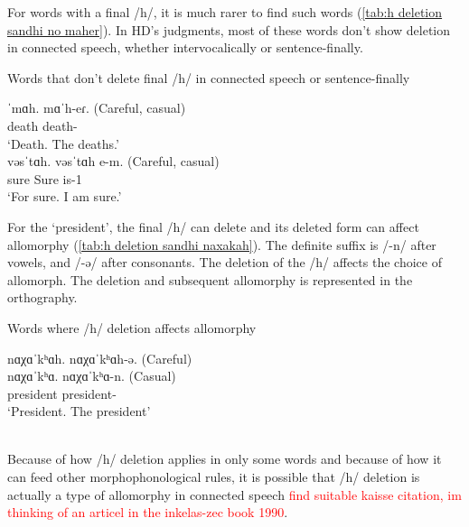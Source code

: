   	For words with a final /h/, it is much rarer to find such words (\ref{tab:h deletion sandhi no maher}). In HD's judgments, most of these words don't show deletion in connected speech, whether intervocalically or sentence-finally. 
  	
  	\begin{exe}
    \ex Words that don't delete final /h/ in connected speech or sentence-finally \label{tab:h deletion sandhi no maher}
    \begin{xlist}
    	\ex \gll ˈmɑh. mɑˈh-eɾ. (Careful, casual)
    	\\
    	death death-{\pl} 
    	\\
    	\trans `Death. The deaths.'
    	\\
    	\ex \gll vəsˈtɑh. vəsˈtɑh e-m. (Careful, casual)
    	\\
    	sure Sure is-1{\sg}
    	\\
    	\trans `For sure. I am sure.'
    	\\
    \end{xlist}
  	\end{exe}
  	
  	For the `president', the final /h/ can delete and its deleted form can affect allomorphy (\ref{tab:h deletion sandhi naxakah}). The definite suffix is /-n/ after vowels, and /-ə/ after consonants. The deletion of the /h/ affects the choice of allomorph. The deletion and subsequent allomorphy is represented in the orthography. 
  	
  	
  	\begin{exe}
    \ex Words where /h/ deletion affects allomorphy \label{tab:h deletion sandhi naxakah}
    \begin{xlist}
    	\ex \glll nɑχɑˈkʰɑh. nɑχɑˈkʰɑh-ə. (Careful)
    	\\
    	nɑχɑˈkʰɑ. nɑχɑˈkʰɑ-n. (Casual)
    	\\
    	president president-{} 
    	\\
    	\trans `President. The president'
    	\\
    	\\
    \end{xlist}
  	\end{exe}
  	
  	
  	
  	
  	
  	
  	Because of how /h/ deletion applies in only some words and because of how it can feed other morphophonological rules, it is possible that /h/ deletion is actually a type of allomorphy in connected speech \textcolor{red}{find suitable kaisse citation, im thinking of an articel in the inkelas-zec book 1990}. 
  	

